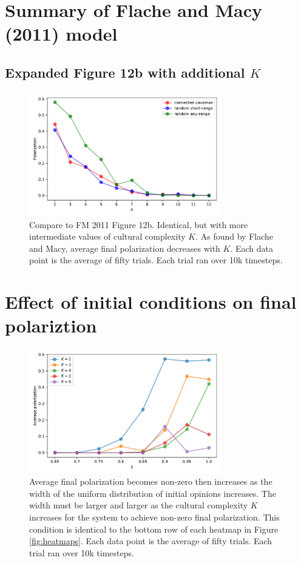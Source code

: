 \documentclass[11pt,letterpaper]{article}
\begin{document}
\section{Summary of Flache and Macy (2011) model}

\subsection{Expanded Figure 12b with additional $K$}
\begin{figure}
  \centering
      \includegraphics[width=0.75\textwidth]{Figures/finegrained_p_vs_K.pdf}
  \caption{
    Compare to FM 2011 Figure 12b. Identical, but with more intermediate
    values of cultural complexity $K$. As found by Flache and Macy, 
    average final polarization decreases with $K$. Each
    data point is the average of fifty trials. Each trial ran over 
    10k timesteps.
  }
  \label{fig:}
\end{figure}


\section{Effect of initial conditions on final polariztion}

\begin{figure}
  \centering
  \includegraphics[width=0.75\textwidth]{Figures/P_vs_S_for_K.pdf}
  \caption{
    Average final polarization becomes non-zero then increases as
    the width of the uniform distribution of initial opinions increases.
    The width must be larger and larger as the cultural complexity $K$ 
    increases for the system to achieve non-zero final polarization. This
    condition is identical to the bottom row of each heatmap in 
    Figure \ref{fig:heatmaps}. Each
    data point is the average of fifty trials. Each trial ran over 
    10k timesteps. 
  }
  \label{fig:p_vs_s_for_k}
\end{figure}
\end{document}
